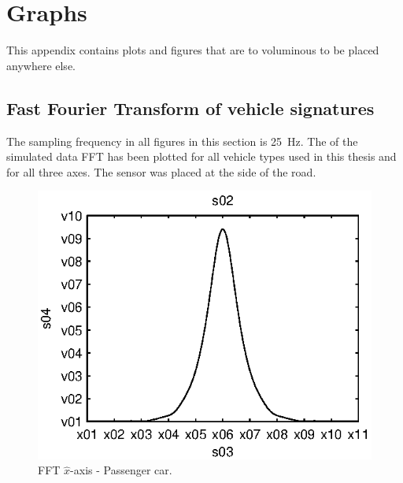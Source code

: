 \cleardoublepage\chapter{Graphs}\label{chap:plots}
This appendix contains plots and figures that are to voluminous to be placed anywhere else.

\section{Fast Fourier Transform of vehicle signatures}
The sampling frequency in all figures in this section is 25~Hz. The of the simulated data FFT has been plotted for all vehicle types used in this thesis and for all three axes. The sensor was placed at the side of the road.

\begin{subfigures}
\begin{figure}[thb]
 \centering
 \begin{minipage}{0.45\linewidth}
 	\centering
 	
	\includegraphics[width=1\linewidth]{images/fft-car-x}
  	\caption[FFT $\hat{x}$-axis - Passenger car]{FFT $\hat{x}$-axis - Passenger car.\\}
  	\label{fig:fft-car-x}
 \end{minipage} \hfill
 \begin{minipage}{0.45\linewidth}
 	\centering
  	

\end{minipage}
\end{figure}
\end{subfigures}

